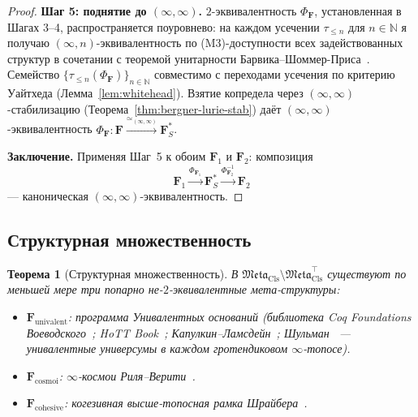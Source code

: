 \documentclass[11pt]{article}
\theoremstyle{plain}
\newtheorem{theorem}{Теорема}[section]
\theoremstyle{definition}
\newcommand{\Meta}{\mathfrak{Meta}}
\begin{document}
\begin{proof}
\textbf{Шаг 5: поднятие до $(\infty, \infty)$.} $2$-эквивалентность $\Phi_\mathbf{F}$, установленная в Шагах 3--4, распространяется поуровнево: на каждом усечении $\tau_{\leq n}$ для $n \in \mathbb{N}$ я получаю $(\infty, n)$-эквивалентность по (M3)-доступности всех задействованных структур в сочетании с теоремой унитарности Барвика--Шоммер-Приса~\cite{BarwickSchommerPries2021}. Семейство $\{\tau_{\leq n}(\Phi_\mathbf{F})\}_{n \in \mathbb{N}}$ совместимо с переходами усечения по критерию Уайтхеда (Лемма~\ref{lem:whitehead}). Взятие копредела через $(\infty, \infty)$-стабилизацию (Теорема~\ref{thm:bergner-lurie-stab}) даёт $(\infty, \infty)$-эквивалентность $\Phi_\mathbf{F} : \mathbf{F} \xrightarrow{\simeq_{(\infty, \infty)}} \mathbf{F}_S^*$.

\textbf{Заключение.} Применяя Шаг~5 к обоим $\mathbf{F}_1$ и $\mathbf{F}_2$: композиция
\[ \mathbf{F}_1 \xrightarrow{\Phi_{\mathbf{F}_1}} \mathbf{F}_S^* \xrightarrow{\Phi_{\mathbf{F}_2}^{-1}} \mathbf{F}_2 \]
— каноническая $(\infty, \infty)$-эквивалентность.
\end{proof}

\subsection{Структурная множественность}

\begin{theorem}[Структурная множественность]\label{thm:meta-mult}
В $\Meta_{\mathrm{Cls}} \setminus \Meta_{\mathrm{Cls}}^{\top}$ существуют по меньшей мере три попарно не-$2$-эквивалентные мета-структуры:
\begin{itemize}
\item $\mathbf{F}_{\mathrm{univalent}}$: программа Унивалентных оснований (библиотека Coq \emph{Foundations} Воеводского~\cite{VoevodskyFoundations2010}; HoTT Book~\cite{HoTTBook2013}; Капулкин--Ламсдейн~\cite{KapulkinLumsdaine2021}; Шульман~\cite{Shulman2019} — унивалентные универсумы в каждом гротендиковом $\infty$-топосе).
\item $\mathbf{F}_{\mathrm{cosmoi}}$: $\infty$-космои Риля--Верити~\cite{RiehlVerity2022}.
\item $\mathbf{F}_{\mathrm{cohesive}}$: когезивная выс\-ше-топосная рамка Шрайбера~\cite{Schreiber2013}.
\end{itemize}
\end{theorem}
\end{document}
